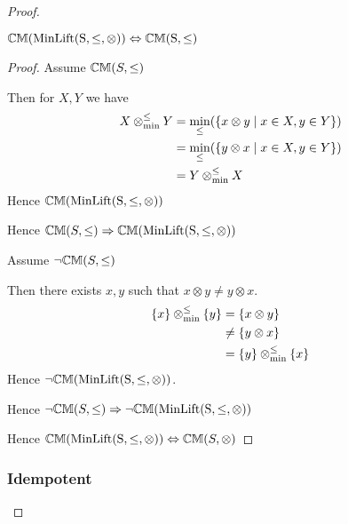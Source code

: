 \documentclass[../Summary.tex]{subfiles}
\begin{document}
\begin{proof}
\begin{theorem} \label{thm:minlift_cm}
${\mathbb{CM}}(\mathrm{MinLift(S,\leq,\otimes)}) \Leftrightarrow {\mathbb{CM}}\mathrm{(S,\leq)}$
\end{theorem}

\begin{proof}

\vspace{0.5em}

Assume ${\mathbb{CM}}(S,\leq)$

\begin{ind}
Then for $X,Y$ we have
\begin{align*}
X \mathbin{\otimes_{\min}^{\leq}} Y 	& = \min_\leq(\{x \otimes y \mid x \in X, y \in Y\}) \\
				& = \min_\leq(\{y \otimes x \mid x \in X, y \in Y\}) \\
				& = Y \mathbin{\otimes_{\min}^{\leq}} X
\end{align*}
Hence ${\mathbb{CM}}(\mathrm{MinLift(S,\leq,\otimes)})$
\end{ind}

Hence ${\mathbb{CM}}(S,\leq) \Rightarrow {\mathbb{CM}}(\mathrm{MinLift(S,\leq,\otimes)})$

\vspace{2em}

Assume $\neg {\mathbb{CM}}(S,\leq)$

\begin{ind}
Then there exists $x,y$ such that $x \otimes y \neq y \otimes x$.
\begin{align*}
\{ x \} \mathbin{\otimes_{\min}^{\leq}} \{ y \} 	& = \{x \otimes y\} \\	
							& \neq \{ y \otimes x \} \\
							& = \{ y \} \mathbin{\otimes_{\min}^{\leq}} \{ x \}
\end{align*}
Hence $\neg {\mathbb{CM}}(\mathrm{MinLift(S,\leq,\otimes)})$.
\end{ind}
Hence $\neg {\mathbb{CM}}(S,\leq) \Rightarrow \neg {\mathbb{CM}}(\mathrm{MinLift(S,\leq,\otimes)})$

\vspace{2em}

Hence ${\mathbb{CM}}(\mathrm{MinLift(S,\leq,\otimes)}) \Leftrightarrow {\mathbb{CM}}(S,\otimes)$
\end{proof}





\subsubsection{Idempotent}


\end{proof}
\end{document}
